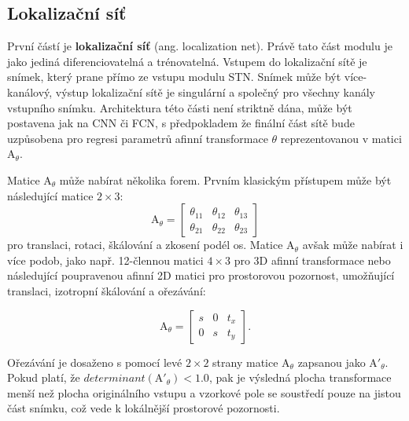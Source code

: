 \subsection{Lokalizační síť}

První částí je \textbf{lokalizační síť} (ang. localization net). Právě tato část modulu je jako jediná diferenciovatelná a trénovatelná. Vstupem do lokalizační sítě je snímek, který prane přímo ze vstupu modulu STN. Snímek může být více-kanálový, výstup lokalizační sítě je singulární a společný pro všechny kanály vstupního snímku. Architektura této části není striktně dána, může být postavena jak na CNN či FCN, s předpokladem že finální část sítě bude uzpůsobena pro regresi parametrů afinní transformace $\theta$ reprezentovanou v matici ${\displaystyle \mathrm {A} }_\theta$.

Matice ${\displaystyle \mathrm {A} }_\theta$ může nabírat několika forem. Prvním klasickým přístupem může být následující matice $2\times3$:
\begin{equation}
    {\displaystyle \mathrm {A} }_\theta = 
    \begin{bmatrix}
        \theta_{11} & \theta_{12} & \theta_{13} \\
        \theta_{21} & \theta_{22} & \theta_{23}
    \end{bmatrix}
    \label{eq:stn_6_theta}
\end{equation}
pro translaci, rotaci, škálování a zkosení podél os. Matice ${\displaystyle \mathrm {A} }_\theta$ avšak může nabírat i více podob, jako např. 12-člennou matici $4\times3$ pro 3D afinní transformace nebo následující poupravenou afinní 2D matici pro prostorovou pozornost, umožňující translaci, izotropní škálování a ořezávání:

\begin{equation}
    {\displaystyle \mathrm {A} }_\theta = 
    \begin{bmatrix}
        s & 0 & t_x \\
        0 & s & t_y
    \end{bmatrix}.
    \label{eq:stn_3_theta}
\end{equation}

Ořezávání je dosaženo s pomocí levé $2\times2$ strany matice ${\displaystyle \mathrm {A} }_\theta$ zapsanou jako ${\displaystyle \mathrm {A'} }_\theta$. Pokud platí, že $determinant({\displaystyle \mathrm {A'} }_\theta) < 1.0$, pak je výsledná plocha transformace menší než plocha originálního vstupu a vzorkové pole se soustředí pouze na jistou část snímku, což vede k lokálnější prostorové pozornosti.

